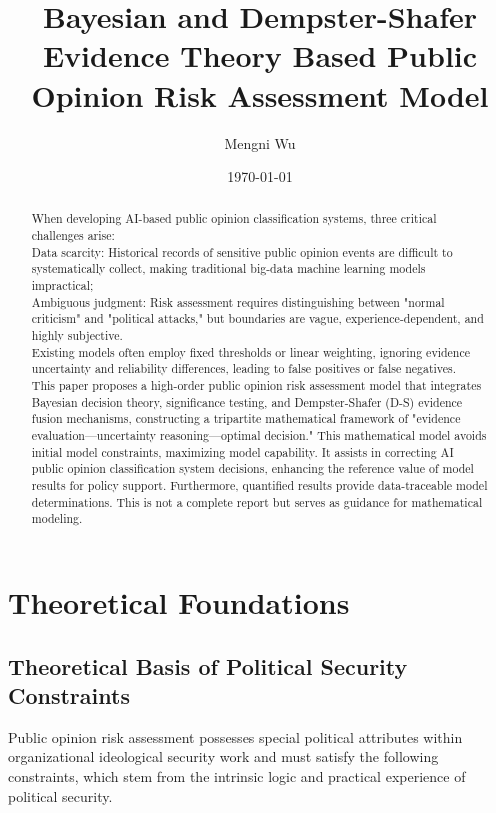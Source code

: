 \documentclass[11pt,a4paper]{report}
\title{\textbf{Bayesian and Dempster-Shafer Evidence Theory Based Public Opinion Risk Assessment Model}}
\author{Mengni Wu}
\date{\today}
\begin{document}
\maketitle

\begin{abstract}
When developing AI-based public opinion classification systems, three critical challenges arise: \\
Data scarcity: Historical records of sensitive public opinion events are difficult to systematically collect, making traditional big-data machine learning models impractical; \\
Ambiguous judgment: Risk assessment requires distinguishing between "normal criticism" and "political attacks," but boundaries are vague, experience-dependent, and highly subjective. \\
Existing models often employ fixed thresholds or linear weighting, ignoring evidence uncertainty and reliability differences, leading to false positives or false negatives. \\
This paper proposes a high-order public opinion risk assessment model that integrates Bayesian decision theory, significance testing, and Dempster-Shafer (D-S) evidence fusion mechanisms, constructing a tripartite mathematical framework of "evidence evaluation—uncertainty reasoning—optimal decision." This mathematical model avoids initial model constraints, maximizing model capability. It assists in correcting AI public opinion classification system decisions, enhancing the reference value of model results for policy support. Furthermore, quantified results provide data-traceable model determinations. This is not a complete report but serves as guidance for mathematical modeling.
\end{abstract}

\tableofcontents
\newpage

\section{Theoretical Foundations}

\subsection{Theoretical Basis of Political Security Constraints}

Public opinion risk assessment possesses special political attributes within organizational ideological security work and must satisfy the following constraints, which stem from the intrinsic logic and practical experience of political security.
\end{document}
